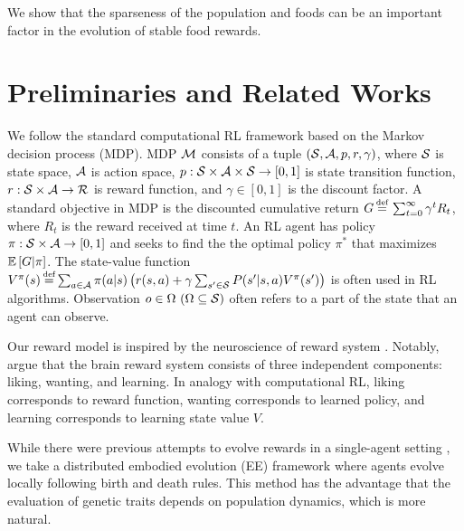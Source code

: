 We show that the sparseness of the population and foods can be an important factor in the evolution of stable food rewards.

\section{Preliminaries and Related Works}\label{sec:related}
We follow the standard computational RL framework \citep{suttonReinforcementLearningIntroduction2018} based on the Markov decision process (MDP). MDP $\mathcal{M}{}$ consists of a tuple $(\mathcal{S}{}, \mathcal{A}{}, p, r, \gamma)$, where $\mathcal{S}{}$ is state space, $\mathcal{A}{}$ is action space, $p: \mathcal{S}\times\mathcal{A}\times \mathcal{S} \rightarrow [0, 1]$ is state transition function, $r: \mathcal{S}\times\mathcal{A} \rightarrow \mathcal{R}$ is reward function, and $\gamma \in [0, 1]$ is the discount factor. A standard objective in MDP is the discounted cumulative return $G \defequal{} \sum_{t=0}^{\infty}\gamma^t R_{t}$, where $R_t$ is the reward received at time $t$. An RL agent has policy $\pi: \mathcal{S} \times \mathcal{A} \rightarrow [0, 1]$ and seeks to find the the optimal policy $\pi^{*}$ that maximizes $\mathbb{E} \left[G|\pi\right]$. The state-value function $V^\pi(s) \defequal \sum_{a \in \A} \pi(a|s) \left( r(s, a) + \gamma \sum_{s' \in \X} P(s'|s, a) V^\pi(s') \right)$ is often used in RL algorithms. Observation $o \in \Omega~(\Omega \subseteq \mathcal{S})$ often refers to a part of the state that an agent can observe.

Our reward model is inspired by the neuroscience of reward system \citep{schultzNeuronalRewardDecision2015, berridgePleasureSystemsBrain2015}. Notably, \citet{berridgeDissectingComponentsReward2009} argue that the brain reward system consists of three independent components: liking, wanting, and learning. In analogy with computational RL, liking corresponds to reward function, wanting corresponds to learned policy, and learning corresponds to learning state value $V$. %

While
there were previous attempts to evolve rewards in a single-agent setting \citep{singhWhereRewardsCome2009,niekumEvolutionRewardFunctions2011,zhengWhatCanLearned2020},
we take a distributed embodied evolution (EE) framework \citep{watsonEmbodiedEvolutionDistributing2002,bredecheEmbodiedEvolutionCollective2018}
where agents evolve locally following birth and death rules. This method has the advantage that the evaluation of genetic traits depends on population dynamics, which is more natural.

